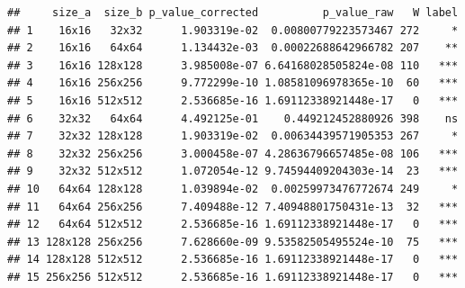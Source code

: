 \documentclass[
]{book}
\newenvironment{Shaded}{\begin{snugshade}}{\end{snugshade}}
\newcommand{\DataTypeTok}[1]{\textcolor[rgb]{0.13,0.29,0.53}{#1}}
\newcommand{\FloatTok}[1]{\textcolor[rgb]{0.00,0.00,0.81}{#1}}
\newcommand{\KeywordTok}[1]{\textcolor[rgb]{0.13,0.29,0.53}{\textbf{#1}}}
\newcommand{\NormalTok}[1]{#1}
\newcommand{\OperatorTok}[1]{\textcolor[rgb]{0.81,0.36,0.00}{\textbf{#1}}}
\newcommand{\StringTok}[1]{\textcolor[rgb]{0.31,0.60,0.02}{#1}}
\begin{document}
\begin{Shaded}
\end{Shaded}

\begin{verbatim}
##     size_a  size_b p_value_corrected          p_value_raw   W label
## 1    16x16   32x32      1.903319e-02  0.00800779223573467 272     *
## 2    16x16   64x64      1.134432e-03  0.00022688642966782 207    **
## 3    16x16 128x128      3.985008e-07 6.64168028505824e-08 110   ***
## 4    16x16 256x256      9.772299e-10 1.08581096978365e-10  60   ***
## 5    16x16 512x512      2.536685e-16 1.69112338921448e-17   0   ***
## 6    32x32   64x64      4.492125e-01    0.449212452880926 398    ns
## 7    32x32 128x128      1.903319e-02  0.00634439571905353 267     *
## 8    32x32 256x256      3.000458e-07 4.28636796657485e-08 106   ***
## 9    32x32 512x512      1.072054e-12 9.74594409204303e-14  23   ***
## 10   64x64 128x128      1.039894e-02  0.00259973476772674 249     *
## 11   64x64 256x256      7.409488e-12 7.40948801750431e-13  32   ***
## 12   64x64 512x512      2.536685e-16 1.69112338921448e-17   0   ***
## 13 128x128 256x256      7.628660e-09 9.53582505495524e-10  75   ***
## 14 128x128 512x512      2.536685e-16 1.69112338921448e-17   0   ***
## 15 256x256 512x512      2.536685e-16 1.69112338921448e-17   0   ***
\end{verbatim}
\end{document}
